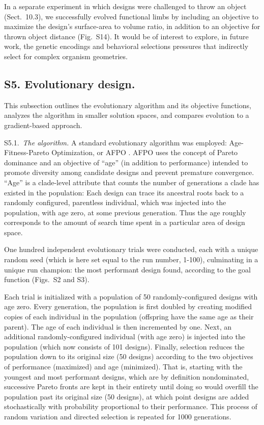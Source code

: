 In a separate experiment in which designs were challenged to throw an object (Sect.~10.3), we successfully evolved functional limbs by including an objective to maximize the design's surface-area to volume ratio, in addition to an objective for thrown object distance (Fig.~S14). 
It would be of interest to explore, in future work, the genetic encodings and behavioral selections pressures that indirectly select for complex organism geometries.


\subsection*{S5. Evolutionary design.}

This subsection outlines the evolutionary algorithm and its objective functions, analyzes the algorithm in smaller solution spaces, and compares evolution to a gradient-based approach.

\vspace{1em}

S5.1.~\textit{The algorithm.} 
A standard evolutionary algorithm was employed: Age-Fitness-Pareto Optimization, or AFPO \cite{schmidt2011age}. 
AFPO uses the concept of Pareto dominance and an objective of ``age'' (in addition to performance) intended to promote diversity among candidate designs and prevent premature convergence. 
``Age'' is a clade-level attribute that counts the number of generations a clade has existed in the population: 
Each design can trace its ancestral roots back to a randomly configured, parentless individual, which was injected into the population, with age zero, at some previous generation. 
Thus the age roughly corresponds to the amount of search time spent in a particular area of design space.

One hundred independent evolutionary trials were conducted, each with a unique random seed (which is here set equal to the run number, 1-100), culminating in a unique run champion: the most performant design found, according to the goal function (Figs.~S2 and S3).

Each trial is initialized with a population of 50 randomly-configured designs with age zero. 
Every generation, the population is first doubled by creating modified copies of each individual in the population (offspring have the same age as their parent). 
The age of each individual is then incremented by one. 
Next, an additional randomly-configured individual (with age zero) is injected into the population (which now consists of 101 designs). 
Finally, selection reduces the population down to its original size (50 designs) according to the two objectives of performance (maximized) and age (minimized). 
That is, starting with the youngest and most performant designs, which are by definition nondominated, successive Pareto fronts are kept in their entirety until doing so would overfill the population past its original size (50 designs), at which point designs are added stochastically with probability proportional to their performance. 
This process of random variation and directed selection is repeated for 1000 generations.

